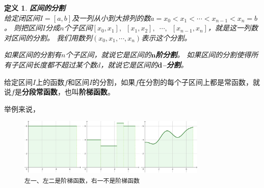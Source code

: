 \documentclass[12pt,UTF8]{ctexbook}
\newtheorem{df}{定义}[section]
\begin{document}



\begin{df}{\textbf{区间的分割}}
    \mbox{} \\
    给定闭区间$I=[a, b]$及一列从小到大排列的数$a = x_0 < x_1 < \cdots < x_{n-1} < x_n = b$。
    则把区间$I$分成$n$个子区间$[x_0, x_1], \,\,\, [x_1, x_2], \,\,\,\cdots, \,\,\,[x_{n-1}, x_n]$，就是这一列数对区间的分割。
    我们用数列$(x_0, x_1, \cdots, x_n)$表示这个分割。

    如果区间的分割有$n$个子区间，就说它是区间的$\boldsymbol{n}$\textbf{阶分割}。
    如果区间的分割使得所有子区间长度都不超过某个数$d$，就说它是区间的$\boldsymbol{d}$\textbf{–分割}。

\end{df}

给定区间$I$上的函数$f$和区间$I$的分割，如果$f$在分割的每个子区间上都是常函数，就说$f$是\textbf{分段常函数}，也叫\textbf{阶梯函数}。

举例来说，

\begin{figure}[h] %
    \vspace{4pt}
    \centering
    \includegraphics[width=0.8\textwidth]{tu/积分定义1.png} %
    \caption*{\texttt{左一、左二是阶梯函数，右一不是阶梯函数}}
\end{figure}
\end{document}
